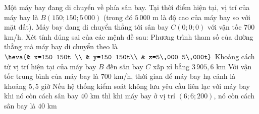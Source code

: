 \begin{ex}%
Một máy bay đang di chuyển về phía sân bay. Tại thời điểm hiện tại, vị trí của máy bay là $B(150;150;5\,000)$ (trong đó $5\,000$ m là độ cao của máy bay so với mặt đất). Máy bay đang di chuyển thẳng tới sân bay $C(0;0;0)$ với vận tốc $700$ km/h. Xét tính đúng sai của các mệnh đề sau:
\choiceTF
{\True Phương trình tham số của đường thẳng mà máy bay di chuyển theo là $\heva{& x=150-150t \\ & y=150-150t\\ & z=5\,000-5\,000t}$}
{Khoảng cách từ vị trí hiện tại của máy bay $B$ đến sân bay $C$ xấp xỉ bằng $3\,905{,}6$ km}
{Với vận tốc trung bình của máy bay là $700$ km/h, thời gian để máy bay hạ cánh là khoảng $5{,}5$ giờ}
{Nếu hệ thống kiểm soát không lưu yêu cầu liên lạc với máy bay khi nó còn cách sân bay $40$ km thì khi máy bay ở vị trí $(6;6;200)$, nó còn cách sân bay là $40$ km}
\end{ex}

